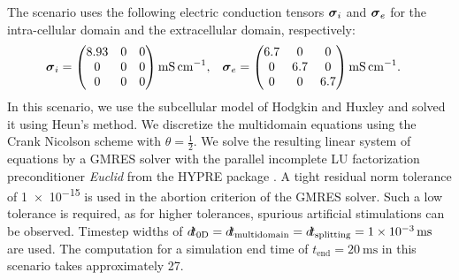 The scenario uses the following electric conduction tensors $\boldsymbol{\sigma}_i$ and $\boldsymbol{\sigma}_e$ for the intra-cellular domain and the extracellular domain, respectively:
\begin{align}\label{eq:multidomain_isotropic_e}
  \bfsigma_i &= \mat{
  8.93 & 0 & 0\\
  0& 0& 0\\
  0& 0& 0}\SI{}{\milli\siemens\per\centi\meter}, &  \bfsigma_e &= \mat{6.7 & 0 & 0\\
        0& 6.7& 0\\
        0& 0& 6.7}\SI{}{\milli\siemens\per\centi\meter}.
\end{align}
%
In this scenario, we use the subcellular model of Hodgkin and Huxley \cite{Hodgkin1952} and solved it using Heun's method. We discretize the multidomain equations using the Crank Nicolson scheme with $\theta=\frac12$.
We solve the resulting linear system of equations by a GMRES solver with the parallel incomplete LU factorization preconditioner \emph{Euclid} \cite{euclid} from the HYPRE package \cite{falgout2002hypre}. A tight residual norm tolerance of \num{1e-15} is used in the abortion criterion of the GMRES solver. Such a low tolerance is required, as for higher tolerances, spurious artificial stimulations can be observed. Timestep widths of $\dt_\text{0D}=\dt_\text{multidomain}=\dt_\text{splitting}=\SI{1e-3}{\ms}$ are used. 
The computation for a simulation end time of $t_\text{end}=\SI{20}{\ms}$ in this scenario takes approximately \SI{27}{\min}.


       
